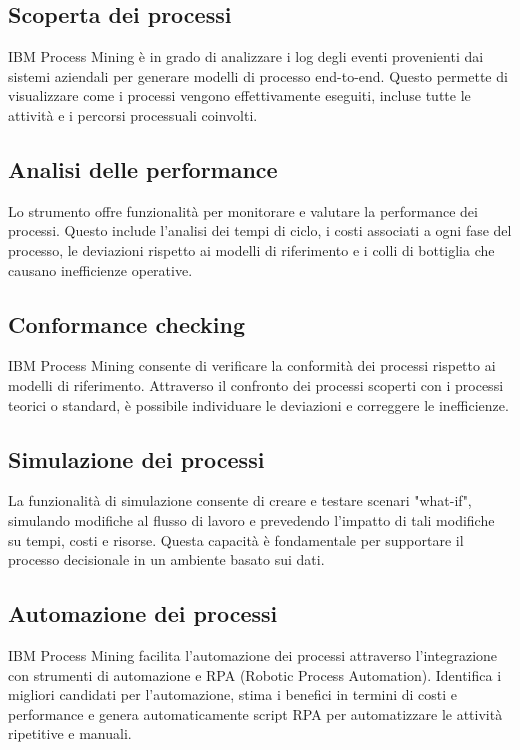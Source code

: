\documentclass{article}
\begin{document}
\subsection{Scoperta dei processi}
IBM Process Mining è in grado di analizzare i log degli eventi provenienti dai sistemi aziendali per generare modelli di processo end-to-end. Questo permette di visualizzare come i processi vengono effettivamente eseguiti, incluse tutte le attività e i percorsi processuali coinvolti.

\subsection{Analisi delle performance}
Lo strumento offre funzionalità per monitorare e valutare la performance dei processi. Questo include l'analisi dei tempi di ciclo, i costi associati a ogni fase del processo, le deviazioni rispetto ai modelli di riferimento e i colli di bottiglia che causano inefficienze operative.

\subsection{Conformance checking}
IBM Process Mining consente di verificare la conformità dei processi rispetto ai modelli di riferimento. Attraverso il confronto dei processi scoperti con i processi teorici o standard, è possibile individuare le deviazioni e correggere le inefficienze.

\subsection{Simulazione dei processi}
La funzionalità di simulazione consente di creare e testare scenari "what-if", simulando modifiche al flusso di lavoro e prevedendo l'impatto di tali modifiche su tempi, costi e risorse. Questa capacità è fondamentale per supportare il processo decisionale in un ambiente basato sui dati.

\subsection{Automazione dei processi}
IBM Process Mining facilita l'automazione dei processi attraverso l'integrazione con strumenti di automazione e RPA (Robotic Process Automation). Identifica i migliori candidati per l'automazione, stima i benefici in termini di costi e performance e genera automaticamente script RPA per automatizzare le attività ripetitive e manuali.
\end{document}
